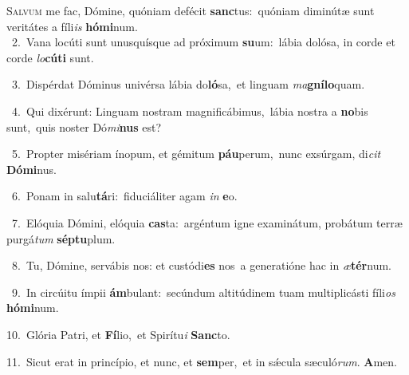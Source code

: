 \lettrine{\initial\textcolor{\initialcolor}{S}}{alvum} me fac, Dómine, quóniam defécit \textbf{sanc}\-tus:~\star quóniam diminútæ sunt veritátes a fíli\textit{is} \textbf{hó}\-\textbf{mi}num.\\
{\numbfont\textcolor{\numbcolor}{~2.}}~Vana locúti sunt unusquísque ad próximum \textbf{su}\-um:~\star lábia dolósa, in corde et corde \textit{lo}\-\textbf{cú}\textbf{ti} sunt.\par
{\numbfont\textcolor{\numbcolor}{~3.}}~Dispérdat Dóminus univérsa lábia do\-\textbf{ló}\-sa,~\star et linguam \textit{ma}\-\textbf{gní}\textbf{lo}quam.\par
{\numbfont\textcolor{\numbcolor}{~4.}}~Qui dixérunt: Linguam nostram magnificábimus,~\dagger lábia nostra a \textbf{no}\-bis sunt,~\star quis noster Dó\-\textit{mi}\-\textbf{nus} est?\par
{\numbfont\textcolor{\numbcolor}{~5.}}~Propter misériam ínopum, et gémitum \textbf{páu}\-perum,~\star nunc exsúrgam, di\textit{cit} \textbf{Dó}\-\textbf{mi}nus.\par
{\numbfont\textcolor{\numbcolor}{~6.}}~Ponam in salu\-\textbf{tá}\-ri:~\star fiduciáliter agam \textit{in} \textbf{e}\-o.\par
{\numbfont\textcolor{\numbcolor}{~7.}}~Elóquia Dómini, elóquia \textbf{cas}\-ta:~\star argéntum igne examinátum, probátum terræ purgá\textit{tum} \textbf{sép}\-\textbf{tu}plum.\par
{\numbfont\textcolor{\numbcolor}{~8.}}~Tu, Dómine, servábis nos: et custódi\textbf{es} nos~\star a generatióne hac in \textit{æ}\-\textbf{tér}num.\par
{\numbfont\textcolor{\numbcolor}{~9.}}~In circúitu ímpii \textbf{ám}\-bulant:~\star secúndum altitúdinem tuam multiplicásti fíli\textit{os} \textbf{hó}\-\textbf{mi}num.\par
{\numbfont\textcolor{\numbcolor}{10.}}~Glória Patri, et \textbf{Fí}\-lio,~\star et Spirítu\textit{i} \textbf{Sanc}\-to.\par
{\numbfont\textcolor{\numbcolor}{11.}}~Sicut erat in princípio, et nunc, et \textbf{sem}\-per,~\star et in sǽcula sæculó\-\textit{rum}\-. \textbf{A}\-men.\par
